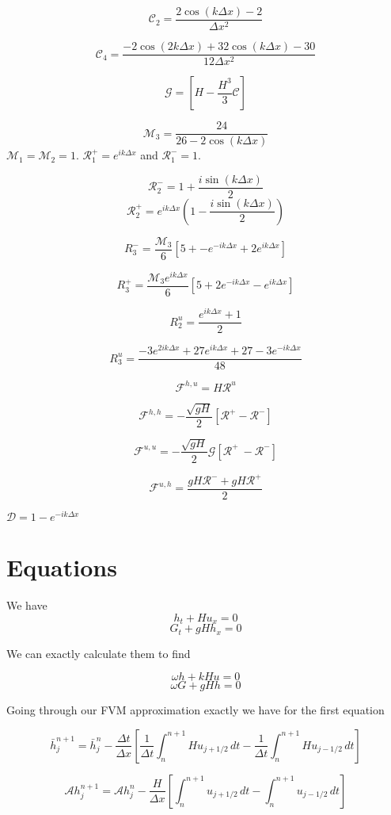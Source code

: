 \documentclass[12pt]{article}
\begin{document}
\[\mathcal{C}_2 = \frac{ 2\cos\left(k\Delta x\right) - 2 }{\Delta x^2}\]

\[\mathcal{C}_4 = \frac{-2\cos\left(2k\Delta x\right) + 32\cos\left(k\Delta x\right)  - 30 }{12\Delta x^2}\]

\[\mathcal{G} = \left[H -\frac{H^3}{3} \mathcal{C}\right]\]

\[\mathcal{M}_3= \frac{24}{26  -2\cos\left(k\Delta x\right)}\]
$\mathcal{M}_1 = \mathcal{M}_2 = 1$.
$\mathcal{R}^+_1 =  e^{ik\Delta x}$ and $\mathcal{R}^-_1 =  1$. 

\[\mathcal{R}_2^- = 1  + \frac{i\sin\left(k\Delta x\right)}{2}\]
\[\mathcal{R}_2^+ = e^{ik\Delta x}\left(1  - \frac{i\sin\left(k\Delta x\right)}{2} \right)\]

\[R_3^-= \frac{\mathcal{M}_3}{6}\left[5 +  - e^{-ik\Delta x} + 2e^{ik\Delta x} \right]\]

\[R_3^+= \frac{\mathcal{M}_3 e^{ik\Delta x }}{6}\left[5 + 2e^{-ik\Delta x} - e^{ik\Delta x} \right]\] 

\[R^u_2 = \frac{e^{ik\Delta x } + 1}{2} \]

\[R^u_3 = \frac{-3e^{2ik\Delta x } + 27e^{ik\Delta x } + 27 - 3e^{-ik\Delta x }}{48}\]


\[\mathcal{F}^{h,u} = H\mathcal{R}^u\]

\[\mathcal{F}^{h,h} = -\dfrac{ \sqrt{gH}}{ 2} \left [ \mathcal{R}^+- \mathcal{R}^- \right ]\]

\[\mathcal{F}^{u,u} = - \dfrac{ \sqrt{gH}}{ 2} \mathcal{G} \left [ \mathcal{R}^+ \ -  \mathcal{R}^-  \right ]\]

\[\mathcal{F}^{u,h} = \dfrac{ gH \mathcal{R}^- + gH \mathcal{R}^+}{ 2}\]


$\mathcal{D} = 1 -e^{-ik\Delta x}$


\section{Equations} 
We have
\[h_t + Hu_x = 0\]
\[G_t + gHh_x = 0\]

We can exactly calculate them to find

\[\omega h + kHu = 0\]
\[\omega G + gHh = 0\]

Going through our FVM approximation exactly we have for the first equation

\[\bar{h}^{n+1} _j = \bar{h}^n_j - \frac{\Delta t}{\Delta x}\left[\frac{1}{\Delta t} \int_n^{n+1} Hu_{j+1/2} \, dt - \frac{1}{\Delta t} \int_n^{n+1} Hu_{j-1/2} \, dt \right]\]

\[\mathcal{A}h^{n+1} _j = \mathcal{A}h^n_j - \frac{H}{\Delta x}\left[ \int_n^{n+1} u_{j+1/2} \, dt -  \int_n^{n+1} u_{j-1/2} \, dt \right]\]
\end{document}
